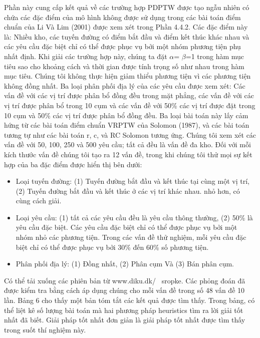 Phần này cung cấp kết quả về các trường hợp PDPTW được tạo ngẫu nhiên có chứa các đặc điểm của mô hình không được sử dụng trong các bài toán điểm chuẩn của Li Và Lim (2001) được xem xét trong Phần 4.4.2. Các đặc điểm này là: Nhiều kho, các tuyến đường có điểm bắt đầu và điểm kết thúc khác nhau và các yêu cầu đặc biệt chỉ có thể được phục vụ bởi một nhóm phương tiện phụ nhất định. Khi giải các trường hợp này, chúng ta đặt $\alpha$= $\beta$=1 trong hàm mục tiêu sao cho khoảng cách và thời gian được tính trọng số như nhau trong hàm mục tiêu. Chúng tôi không thực hiện giảm thiểu phương tiện vì các phương tiện không đồng nhất. 
Ba loại phân phối địa lý của các yêu cầu được xem xét: Các vấn đề với các vị trí được phân bổ đồng đều trong mặt phẳng, các vấn đề với các vị trí được phân bổ trong 10 cụm và các vấn đề với 50\% các vị trí được đặt trong 10 cụm và 50\% các vị trí được phân bổ đồng đều. Ba loại bài toán này lấy cảm hứng từ các bài toán điểm chuẩn VRPTW của Solomon (1987), và các bài toán tương tự như các bài toán r, c, và RC Solomon tương ứng. Chúng tôi xem xét các vấn đề với 50, 100, 250 và 500 yêu cầu; tất cả đều là vấn đề đa kho. Đối với mỗi kích thước vấn đề chúng tôi tạo ra 12 vấn đề, trong khi chúng tôi thử mọi sự kết hợp của ba đặc điểm được hiển thị bên dưới:
\begin{itemize}
    \item Loại tuyến đường: (1) Tuyến đường bắt đầu và kết thúc tại cùng một vị trí, (2) Tuyến đường bắt đầu và kết thúc ở các vị trí khác nhau.
    nhỏ hơn, có cùng cách giải.
    \item Loại yêu cầu: (1) tất cả các yêu cầu đều là yêu cầu thông thường, (2) 50\% là yêu cầu đặc biệt. Các yêu cầu đặc biệt chỉ có thể được phục vụ bởi một nhóm nhỏ các phương tiện. Trong các vấn đề thử nghiệm, mỗi yêu cầu đặc biệt chỉ có thể được phục vụ bởi 30\% đến 60\% số phương tiện.
    \item Phân phối địa lý: (1) Đồng nhất, (2) Phân cụm Và (3) Bán phân cụm.
\end{itemize}
Có thể tải xuống các phiên bản từ www.diku.dk/ ~sropke. Các phỏng đoán đã được kiểm tra bằng cách áp dụng chúng cho mỗi vấn đề trong số 48 vấn đề 10 lần. Bảng 6 cho thấy một bản tóm tắt các kết quả được tìm thấy. Trong bảng, có thể liệt kê số lượng bài toán mà hai phương pháp heuristics tìm ra lời giải tốt nhất đã biết. Giải pháp tốt nhất đơn giản là giải pháp tốt nhất được tìm thấy trong suốt thí nghiệm này.


